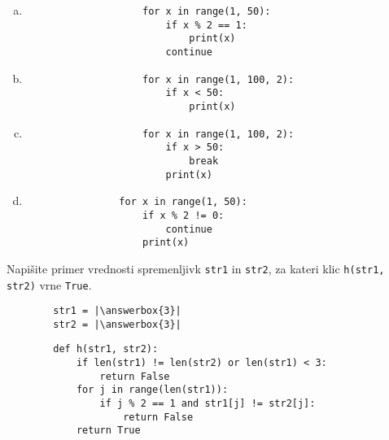 \documentclass[arhiv, 10pt]{../izpit}
\newcommand{\inlinepy}[1]{\texttt{#1}}
\newcommand{\answerbox}[1]{\framebox{\vphantom{\large M}\hspace{#1cm}}}
\begin{document}
        \begin{multicols}{2}
        \begin{enumerate}[(a)]
\item 
                \begin{verbatim}
                    for x in range(1, 50):
                        if x % 2 == 1:
                            print(x)
                        continue
                \end{verbatim}
            
\item 
                \begin{verbatim}
                    for x in range(1, 100, 2):
                        if x < 50:
                            print(x)
                \end{verbatim}
            
\item 
                \begin{verbatim}
                    for x in range(1, 100, 2):
                        if x > 50:
                            break
                        print(x)
                \end{verbatim}
            
\item 
            \begin{verbatim}
                for x in range(1, 50):
                    if x % 2 != 0:
                        continue
                    print(x)
            \end{verbatim}
        
\end{enumerate}

        \end{multicols}
    
        \naloga*
        \begin{multicols}{2}
        \noindent
        Napišite primer vrednosti spremenljivk \inlinepy{str1} in \inlinepy{str2}, za kateri klic \inlinepy{h(str1, str2)} vrne \inlinepy{True}.
        \begin{verbatim}
        str1 = |\answerbox{3}|
        str2 = |\answerbox{3}|
        \end{verbatim}
        \vfil
        \columnbreak
        \begin{verbatim}
        def h(str1, str2):
            if len(str1) != len(str2) or len(str1) < 3:
                return False
            for j in range(len(str1)):
                if j % 2 == 1 and str1[j] != str2[j]:
                    return False
            return True
        \end{verbatim}
        \end{multicols}
    
\end{document}
